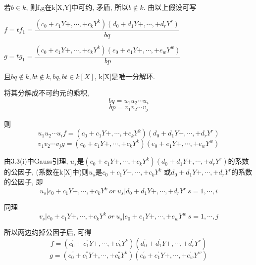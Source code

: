 \documentclass[UTF8]{book}
\begin{document}
	若$b\in k$, 则f,g在k[X,Y]中可约, 矛盾, 所以$b\notin k$. 由以上假设可写
	
	$f=tf_{1}=\dfrac{(c_{0}+c_{1}Y+, \cdots ,+c_{k}Y^{k})(d_{0}+d_{1}Y+, \cdots ,+d_{r}Y^{r})}{bq} $
	
	$g=tg_{1}=\dfrac{(c_{0}+c_{1}Y+, \cdots ,+c_{k}Y^{k})(e_{0}+e_{1}Y+, \cdots ,+e_{w}Y^{w})}{bp}$
	
	且$bq\notin k, bt\notin k, bq, bt\in k[X]$, k[X]是唯一分解环.
	
	将其分解成不可约元的乘积,
	\begin{equation*}
	bq=u_{1}u_{2} \cdots u_{i}
	\end{equation*}
	\begin{equation*}
	bp=v_{1}v_{2} \cdots v_{j}
	\end{equation*}
	
	则
	\begin{equation*}
	u_{1}u_{2} \cdots u_{i}f=(c_{0}+c_{1}Y+, \cdots ,+c_{k}Y^{k}) (d_{0}+d_{1}Y+, \cdots ,+d_{r}Y^{r})
	\end{equation*}
	\begin{equation*}
	v_{1}v_{2} \cdots v_{j}g=(c_{0}+c_{1}Y+, \cdots ,+c_{k}Y^{k}) (e_{0}+e_{1}Y+, \cdots ,+e_{w}Y^{w})
	\end{equation*}
	
	由3.3(i)中Gauss引理, $u_{s}$是$(c_{0}+c_{1}Y+, \cdots ,+c_{k}Y^{k}) (d_{0}+d_{1}Y+, \cdots ,+d_{r}Y^{r})$的系数的公因子, (系数在k[X]中)则$u_{s}$是$c_{0}+c_{1}Y+, \cdots ,+c_{k}Y^{k}$ 或$d_{0}+d_{1}Y+, \cdots ,+d_{r}Y^{r}$的系数的公因子, 即
	\begin{equation*}
	u_{s} \vert c_{0}+c_{1}Y+, \cdots ,+c_{k}Y^{k} \ or \ u_{s} \vert d_{0}+d_{1}Y+, \cdots ,+d_{r}Y^{r} \ s=1, \cdots , i
	\end{equation*}
	
	同理
	\begin{equation*}
	v_{s} \vert c_{0}+c_{1}Y+, \cdots ,+c_{k}Y^{k} \ or \ u_{s} \vert e_{0}+e_{1}Y+, \cdots ,+e_{w}Y^{w}  \ s=1, \cdots , j
	\end{equation*}
	
	所以两边约掉公因子后, 可得
	\begin{equation*}
	f=(c^{'}_{0}+c^{'}_{1}Y+, \cdots ,+c^{'}_{k}Y^{k}) (d^{'}_{0}+d^{'}_{1}Y+, \cdots ,+d^{'}_{r}Y^{r})
	\end{equation*}
	\begin{equation*}
	g=(c^{''}_{0}+c^{''}_{1}Y+, \cdots ,+c^{''}_{k}Y^{k}) (e^{'}_{0}+e^{'}_{1}Y+, \cdots ,+e^{'}_{w}Y^{w})
	\end{equation*}
	
\end{document}
